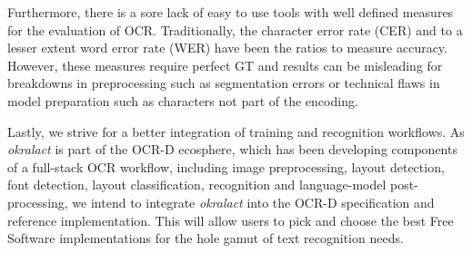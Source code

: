 \documentclass[conference]{IEEEtran}
\begin{document}

Furthermore, there is a sore lack of easy to use tools with well
defined measures for the evaluation of OCR. Traditionally, the
character error rate (CER) and to a lesser extent word error rate
(WER) have been the ratios to measure accuracy. However, these
measures require perfect GT and results can be misleading for
breakdowns in preprocessing such as segmentation errors or
technical flaws in model preparation such as characters not part
of the encoding.




Lastly, we strive for a better integration of training and
recognition workflows. As \textit{okralact} is part of the OCR-D
ecosphere, which has been developing components of a full-stack
OCR workflow, including image preprocessing, layout detection, font
detection, layout classification, recognition and language-model
post-processing, we intend to integrate \textit{okralact} into the
OCR-D specification and reference implementation. This will allow
users to pick and choose the best Free Software implementations for
the hole gamut of text recognition needs.



\end{document}
